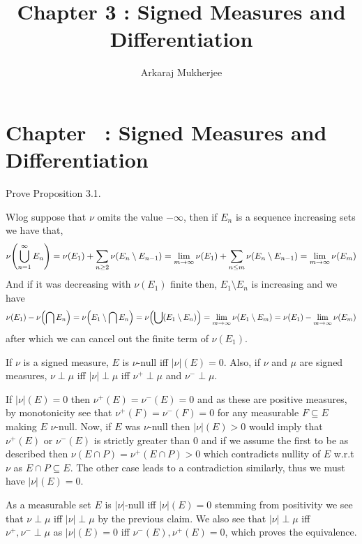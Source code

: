 \documentclass[12pt,a4paper]{article}
\title{\textbf{Chapter 3 : Signed Measures and Differentiation}}
\author{Arkaraj Mukherjee}
\begin{document}
\maketitle
\newpage
\tableofcontents
\newpage
\setcounter{section}{3}
\section*{Chapter \thesection\ : Signed Measures and Differentiation}

\begin{problem}\label{prob:3-1}
Prove Proposition 3.1.
\end{problem}
\begin{solution}
Wlog suppose that $\nu$ omits the value $-\infty$, then if $E_n$ is a sequence increasing sets we have that,
\[
	\nu \qty(\bigcup_{n=1}^\infty E_n)=\nu(E_1)+ \sum_{n\geq 2}\nu(E_n\setminus E_{n-1})=\lim_{m\to\infty} \nu(E_1)+ \sum_{n\leq m}\nu(E_n\setminus E_{n-1})=\lim_{m\to\infty}\nu(E_m)
\]
And if it was decreasing with $\nu(E_1)$ finite then, $E_1\setminus E_n$ is increasing and we have
\[
	\nu(E_1)-\nu \qty(\bigcap E_n)=\nu \qty(E_1\setminus\bigcap E_n)=\nu \qty(\bigcup(E_1\setminus E_n))=\lim_{m\to\infty}\nu(E_1\setminus E_m)=\nu(E_1)- \lim_{m\to\infty}\nu(E_m)
\]
after which we can cancel out the finite term of $\nu(E_1)$.
\end{solution}
\begin{problem}\label{prob:3-2}
If $\nu$ is a signed measure, $E$ is $\nu$-null iff $|\nu|(E)=0$. Also, if $\nu$ and $\mu$ are signed measures, $\nu\perp\mu$ iff $|\nu|\perp\mu$ iff $\nu^{+}\perp\mu$ and $\nu^{-}\perp\mu$.
\end{problem}
\begin{solution}
If $|\nu|(E)=0$ then $\nu^+(E)=\nu^-(E)=0$ and as these are positive measures, by monotonicity see that $\nu^+(F)=\nu^-(F)=0$ for any measurable $F\subseteq E$ making $E$ $\nu$-null. 
Now, if $E$ was $\nu$-null then $|\nu|(E)>0$ would imply that $\nu^+(E)$ or $\nu^-(E)$ is strictly greater than $0$ and if we assume the first to be as described then $\nu(E\cap P)=\nu^+(E\cap P)>0$ which contradicts nullity of $E$ w.r.t $\nu$ as $E\cap P \subseteq E$. 
The other case leads to a contradiction similarly, thus we must have $|\nu|(E)=0$. 

As a measurable set $E$ is $|\nu|$-null iff $|\nu|(E)=0$ stemming from positivity we see that $\nu\perp\mu$ iff $|\nu|\perp\mu$ by the previous claim. 
We also see that $|\nu|\perp\mu$ iff $\nu^+,\nu^-\perp\mu$ as $|\nu|(E)=0$ iff $\nu^-(E),\nu^+(E)=0$, which proves the equivalence.
\end{solution}
\end{document}
